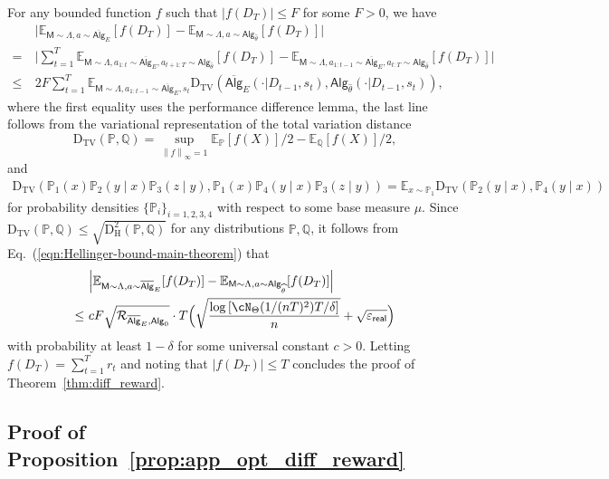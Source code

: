 \documentclass[10pt]{article}
\renewcommand{\epsilon}{\varepsilon}
\newcommand{\norm}[1]{\left\|{#1}\right\|}
\newcommand{\linf}[1]{\norm{#1}_\infty}
\newcommand{\<}{\left\langle}
\renewcommand{\>}{\right\rangle}
\newcommand{\brac}[1]{{\left[ #1 \right]}}
\newcommand{\E}{\mathbb{E}}
\renewcommand{\P}{\mathbb{P}}
\newcommand{\Q}{\mathbb{Q}}
\newcommand{\inst}{{\mathsf{M}}}
\newcommand{\HelDs}{{\mathrm{D}^2_{\mathrm{H}}}}
\newcommand{\VarD}{{\mathrm{D}_{\mathrm{TV}}}}
\newcommand{\state}{{s}}
\newcommand{\action}{{a}}
\newcommand{\reward}{{r}}
\newcommand{\totlen}{{T}}
\newcommand{\sAlg}{{\mathsf{Alg}}}
\newcommand{\osAlg}{\overline{\mathsf{Alg}}}
\newcommand{\dset}{{D}}
\newcommand{\Numobs}{{n}}
\newcommand{\Parspace}{{\Theta}}
\newcommand{\EstPar}{{\widehat{\theta}}}
\newcommand{\prior}{{\Lambda}}
\newcommand{\shortexp}{{E}}
\newcommand{\geneps}{{\epsilon}_{\sf real}}
\newcommand{\distratio}{{\mathcal{R}}}
\def\sP{{\mathbb{P}}}
\def\sQ{{\mathbb{Q}}}
\begin{document}
For any bounded function $f$ such that $|f(\dset_\totlen)|\leq F$ for some $F>0$,  we have
\begin{align*}
  &~ \Big| \E_{\inst\sim\prior,\action\sim\osAlg_\shortexp}[f(\dset_\totlen)]-
   \E_{\inst\sim\prior,\action\sim\sAlg_\EstPar}[f(\dset_\totlen)]\Big|
   \\
   =&~
\Big| \sum_{t=1}^\totlen\E_{\inst\sim\prior,\action_{1:t}\sim\osAlg_\shortexp,\action_{t+1:\totlen}\sim\sAlg_\EstPar}[f(\dset_\totlen)]-
\E_{\inst\sim\prior,\action_{1:t-1}\sim\osAlg_{\shortexp},\action_{t:\totlen}\sim\sAlg_\EstPar}[f(\dset_\totlen)]\Big|
   \\
\leq&~
2F\sum_{t=1}^\totlen\E_{\inst\sim\prior,\action_{1:t-1}\sim\osAlg_{\shortexp},\state_t}\VarD(\osAlg_{\shortexp}(\cdot|\dset_{t-1},\state_t),\sAlg_{\EstPar}(\cdot|\dset_{t-1},\state_t)),
\end{align*}
where the first equality uses the performance difference lemma, the last line follows from the variational representation of the total variation distance $$\VarD(\sP,\sQ)=\sup_{\linf{f}=1}\E_\sP[f(X)]/2-\E_\sQ[f(X)]/2,$$  and \begin{align}
\VarD(\sP_1(x)\sP_2(y\mid x)\sP_3(z\mid y),\sP_1(x)\sP_{4}(y\mid x)\sP_3(z\mid y))=\E_{x\sim\sP_1}\VarD(\sP_2(y\mid x),\sP_{4}(y\mid x))\label{eq:kl_telescope}
\end{align}
for probability densities $\{ \P_i\}_{i=1,2,3,4}$ with respect to some base measure $\mu$. Since $\VarD(\P,\Q)\leq\sqrt{\HelDs(\P,\Q)}$ for any distributions $\P,\Q$,  it follows from Eq.~(\ref{eqn:Hellinger-bound-main-theorem}) that
\begin{align*}
 &~ \Big| \E_{\inst\sim\prior,\action\sim\osAlg_{\shortexp}}[f(\dset_\totlen)]-
   \E_{\inst\sim\prior,\action\sim\sAlg_\EstPar}[f(\dset_\totlen)]\Big|\\


  \leq &~cF\sqrt{\distratio_{\osAlg_{\shortexp},\sAlg_0}}\cdot\totlen\Big(\sqrt{\frac{\log \brac{ \cN_{\Parspace}(1/(\Numobs\totlen)^2) \totlen/\delta } }{n}} + \sqrt{\geneps}\Big)
\end{align*}
with probability at least $1-\delta$ for some universal constant $c>0$. Letting $f(\dset_\totlen)=\sum_{t=1}^\totlen\reward_t$  and noting that  $|f(\dset_\totlen)|\leq\totlen$ concludes the proof of Theorem~\ref{thm:diff_reward}.









\subsection{Proof of Proposition~\ref{prop:app_opt_diff_reward}}\label{app:proof-prop-diff-reward-app-opt}
\end{document}
